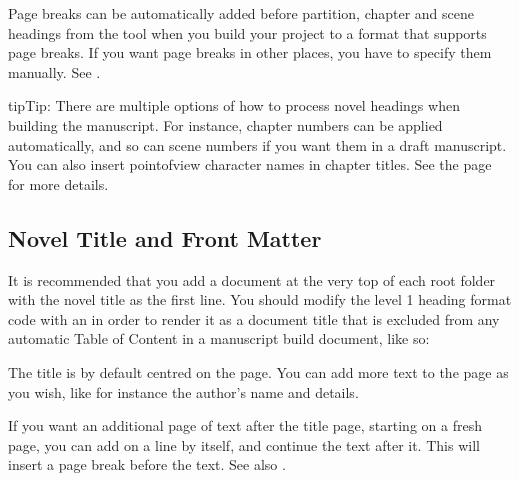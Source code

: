 \documentclass[a4paper,11pt,english]{sphinxmanual}
\begin{document}
\sphinxAtStartPar
Page breaks can be automatically added before partition, chapter and scene headings from the
 tool when you build your project to a format that supports page breaks. If you
want page breaks in other places, you have to specify them manually. See {\hyperref[\detokenize{usage_format:a-fmt-break}]{}}.

\begin{sphinxadmonition}{tip}{Tip:}
\sphinxAtStartPar
There are multiple options of how to process novel headings when building the manuscript. For
instance, chapter numbers can be applied automatically, and so can scene numbers if you want
them in a draft manuscript. You can also insert point\sphinxhyphen{}of\sphinxhyphen{}view character names in chapter titles.
See the {\hyperref[\detokenize{project_manuscript:a-manuscript}]{}} page for more details.
\end{sphinxadmonition}


\subsection{Novel Title and Front Matter}
\label{\detokenize{project_structure:novel-title-and-front-matter}}\label{\detokenize{project_structure:a-struct-heads-title}}
\sphinxAtStartPar
It is recommended that you add a document at the very top of each  root folder with the
novel title as the first line. You should modify the level 1 heading format code with an \sphinxcode{\sphinxupquote{!}} in
order to render it as a document title that is excluded from any automatic Table of Content in a
manuscript build document, like so:

\begin{sphinxVerbatim}[commandchars=\\\{\}]

\PYGZgt{}\PYGZgt{}  \PYGZlt{}\PYGZlt{}
\end{sphinxVerbatim}

\sphinxAtStartPar
The title is by default centred on the page. You can add more text to the page as you wish, like
for instance the author’s name and details.

\sphinxAtStartPar
If you want an additional page of text after the title page, starting on a fresh page, you can add
 on a line by itself, and continue the text after it. This will insert a page break
before the text. See also {\hyperref[\detokenize{usage_format:a-fmt-break}]{}}.
\end{document}
